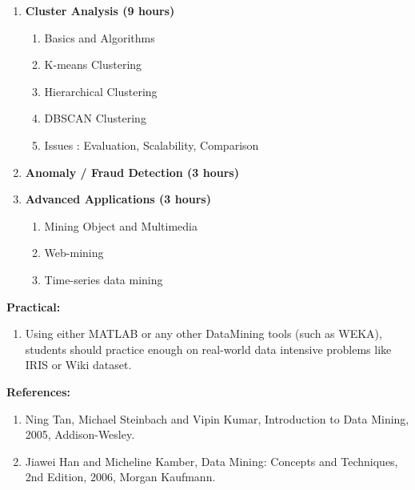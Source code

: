 \begin{enumerate}
  \item \textbf{Cluster Analysis \hfill (9 hours)}
    \begin{enumerate}
      \item Basics and Algorithms
      \item K-means Clustering
      \item Hierarchical Clustering
      \item DBSCAN Clustering
      \item Issues : Evaluation, Scalability, Comparison
    \end{enumerate}
    \vs

  \item \textbf{Anomaly / Fraud Detection \hfill (3 hours)}
    \vs

  \item \textbf{Advanced Applications \hfill (3 hours)}
    \begin{enumerate}
      \item Mining Object and Multimedia
      \item Web-mining
      \item Time-series data mining
    \end{enumerate}
    \vs
\end{enumerate}
\Vs

\noindent \textbf{Practical:}
  \begin{enumerate}[label=\arabic*.]
    \item Using either MATLAB or any other DataMining tools (such as WEKA), students should practice enough on real-world data intensive problems like IRIS or Wiki dataset.
  \end{enumerate}
  \Vs

\noindent \textbf{References:}
  \begin{enumerate}[label=\arabic*.]
    \item Ning Tan, Michael Steinbach and Vipin Kumar, Introduction to Data Mining, 2005, Addison-Wesley.
    \item Jiawei Han and Micheline Kamber, Data Mining: Concepts and Techniques, 2nd Edition, 2006, Morgan Kaufmann.
  \end{enumerate}

\newpage
